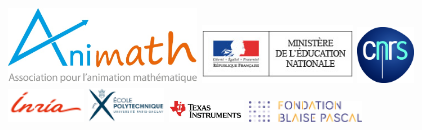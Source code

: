 \begin{figure}[h!]
	
	\vspace{1cm}
	
	\centering
  \begin{minipage}[c]{4cm}
     \centering
	   \includegraphics[width=5cm]{01-Intro/logos/animath.jpg}
   \end{minipage}
   
   \vspace{2cm}

   \begin{minipage}[c]{4cm}
   \centering
        \includegraphics[width=4cm]{01-Intro/logos/education_nationale.jpg}
   \end{minipage} \hfill
   \begin{minipage}[c]{2cm}
   \centering
      \includegraphics[width=1.5cm]{01-Intro/logos/cnrs.jpg}
   \end{minipage} \hfill \hskip 1cm
   \begin{minipage}[c]{2cm}
   \centering
      \includegraphics[width=2cm]{01-Intro/logos/inria.png}
   \end{minipage}
   
   \bigskip

   \begin{minipage}[c]{2cm}
   \centering
   \includegraphics[width=2cm]{01-Intro/logos/polytechnique.jpg}
   \end{minipage} \hskip 2cm \hfill
      \begin{minipage}[c]{2cm}
   \centering
        \includegraphics[width=2cm]{01-Intro/logos/texas.jpg}
   \end{minipage} \hfill
   \begin{minipage}[c]{3cm}
   \centering
      \includegraphics[width=3cm]{01-Intro/logos/fondation_blaise_pascal.jpg}
   \end{minipage} 
   

\end{figure}
